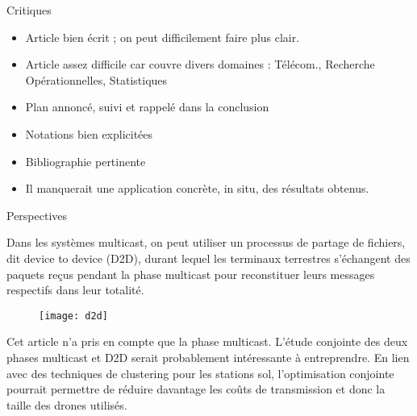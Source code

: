 \begin{frame} {Critiques}
\begin{itemize}
	\item Article bien écrit ; on peut difficilement faire plus clair.
	\item Article assez difficile car couvre divers domaines : Télécom., Recherche Opérationnelles, Statistiques
	\item Plan annoncé, suivi et rappelé dans la conclusion
	\item Notations bien explicitées
	\item Bibliographie pertinente
	\item Il manquerait une application concrète, in situ, des résultats obtenus.
\end{itemize}


\end{frame}



\begin{frame} {Perspectives}

Dans les systèmes multicast, on peut utiliser un processus de partage de fichiers,
dit device to device (D2D), durant lequel les terminaux terrestres
s'échangent des paquets reçus pendant la phase multicast pour reconstituer leurs messages
respectifs dans leur totalité. 


\begin{figure}
	\centering
	\texttt{[image: d2d]}
	\label{fig:d2d}
\end{figure}


\end{frame}


\begin{frame} {}

Cet article n'a pris en compte que la phase multicast. L'étude conjointe
des deux phases multicast et D2D serait probablement intéressante à entreprendre.
En lien avec des techniques de clustering pour les stations sol, l'optimisation
conjointe pourrait permettre de réduire davantage les coûts de transmission et donc la taille des drones
utilisés.

\end{frame}